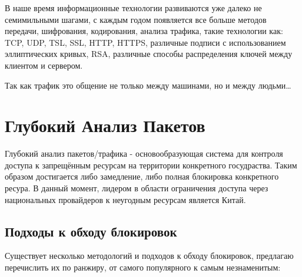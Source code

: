 \documentclass[utf8,14pt,a4paper,oneside,russian]{book}
\begin{document}
В наше время информационные технологии развиваются уже далеко не семимильными шагами, с каждым годом
появляется все больше методов передачи, шифрования, кодирования, анализа трафика, такие технологии как:
TCP, UDP, TSL, SSL, HTTP, HTTPS, различные подписи с использованием эллиптических кривых, RSA, различные
способы распределения ключей между клиентом и сервером.

Так как трафик это общение не только между машинами, но и между людьми\dots


\newpage
\section{Глубокий Анализ Пакетов}

Глубокий анализ пакетов/трафика - основообразующая система для контроля доступа к запрещённым ресурсам на территории конкретного госудраства.
Таким образом достигается либо замедление, либо полная блокировка конкретного ресура. В данный момент, лидером в области ограничения доступа
через национальных провайдеров к неугодным ресурсам является Китай.

\subsection{Подходы к обходу блокировок}

Существует несколько методологий и подходов к обходу блокировок, предлагаю перечислить их по ранжиру, от самого популярного к самым незнаменитым:
\end{document}

